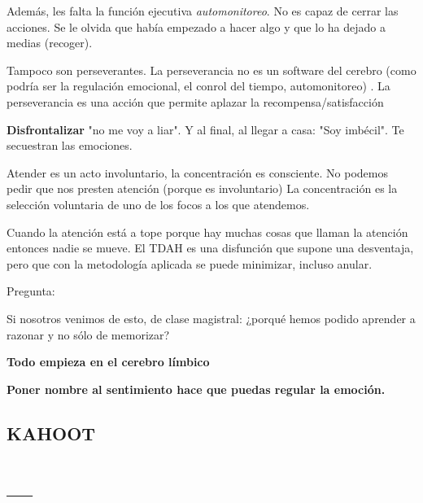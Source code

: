\documentclass[palatino]{apuntes}
\begin{document}
Además, les falta la función ejecutiva \textit{automonitoreo}. No es capaz de cerrar las acciones. Se le olvida que había empezado a hacer algo y que lo ha dejado a medias (recoger).

Tampoco son perseverantes. La perseverancia no es un software del cerebro (como podría ser la regulación emocional, el conrol del tiempo, automonitoreo) .
%
La perseverancia es una acción que permite aplazar la recompensa/satisfacción

\textbf{Disfrontalizar} "no me voy a liar". Y al final, al llegar a casa: "Soy imbécil". Te secuestran las emociones.

Atender es un acto involuntario, la concentración es consciente. 
%
No podemos pedir que nos presten atención (porque es involuntario)
%
La concentración es la selección voluntaria de uno de los focos a los que atendemos.


Cuando la atención está a tope porque hay muchas cosas que llaman la atención entonces nadie se mueve. 
%
El TDAH es una disfunción que supone una desventaja, pero que con la metodología aplicada se puede minimizar, incluso anular.



Pregunta: 

Si nosotros venimos de esto, de clase magistral: ¿porqué hemos podido aprender a razonar y no sólo de memorizar? 



\textbf{Todo empieza en el cerebro límbico}

\textbf{Poner nombre al sentimiento hace que puedas regular la emoción.}

\section{KAHOOT}

\appendix

\chapter{---}


\printindex
\end{document}
